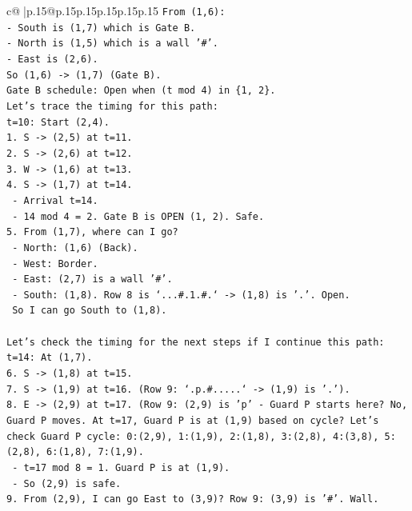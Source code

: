 \documentclass{article}
\begin{document}
{\begin{supertabular}{c@{$\;$}|p{.15\linewidth}@{}p{.15\linewidth}p{.15\linewidth}p{.15\linewidth}p{.15\linewidth}p{.15\linewidth}}
{{{\texttt{From (1,6):} \\
\texttt{{-} South is (1,7) which is Gate B.} \\
\texttt{{-} North is (1,5) which is a wall '\#'.} \\
\texttt{{-} East is (2,6).} \\
\texttt{So (1,6) {-}> (1,7) (Gate B).} \\
\texttt{Gate B schedule: Open when (t mod 4) in \{1, 2\}.} \\
\texttt{Let's trace the timing for this path:} \\
\texttt{t=10: Start (2,4).} \\
\texttt{1. S {-}> (2,5) at t=11.} \\
\texttt{2. S {-}> (2,6) at t=12.} \\
\texttt{3. W {-}> (1,6) at t=13.} \\
\texttt{4. S {-}> (1,7) at t=14.} \\
\texttt{   {-} Arrival t=14.} \\
\texttt{   {-} 14 mod 4 = 2. Gate B is OPEN (1, 2). Safe.} \\
\texttt{5. From (1,7), where can I go?} \\
\texttt{   {-} North: (1,6) (Back).} \\
\texttt{   {-} West: Border.} \\
\texttt{   {-} East: (2,7) is a wall '\#'.} \\
\texttt{   {-} South: (1,8). Row 8 is `...\#.1.\#.` {-}> (1,8) is '.'. Open.} \\
\texttt{   So I can go South to (1,8).} \\
\\ 
\texttt{Let's check the timing for the next steps if I continue this path:} \\
\texttt{t=14: At (1,7).} \\
\texttt{6. S {-}> (1,8) at t=15.} \\
\texttt{7. S {-}> (1,9) at t=16. (Row 9: `.p.\#.....` {-}> (1,9) is '.').} \\
\texttt{8. E {-}> (2,9) at t=17. (Row 9: (2,9) is 'p' {-} Guard P starts here? No, Guard P moves. At t=17, Guard P is at (1,9) based on cycle? Let's check Guard P cycle: 0:(2,9), 1:(1,9), 2:(1,8), 3:(2,8), 4:(3,8), 5:(2,8), 6:(1,8), 7:(1,9).} \\
\texttt{   {-} t=17 mod 8 = 1. Guard P is at (1,9).} \\
\texttt{   {-} So (2,9) is safe.} \\
\texttt{9. From (2,9), I can go East to (3,9)? Row 9: (3,9) is '\#'. Wall.} \\
}}}
\end{supertabular}}
\end{document}
